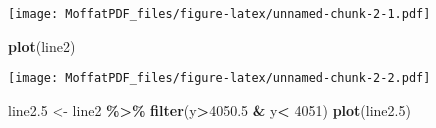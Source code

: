 \documentclass[
]{article}
\newenvironment{Shaded}{\begin{snugshade}}{\end{snugshade}}
\newcommand{\CommentTok}[1]{\textcolor[rgb]{0.56,0.35,0.01}{\textit{#1}}}
\newcommand{\DecValTok}[1]{\textcolor[rgb]{0.00,0.00,0.81}{#1}}
\newcommand{\FloatTok}[1]{\textcolor[rgb]{0.00,0.00,0.81}{#1}}
\newcommand{\FunctionTok}[1]{\textcolor[rgb]{0.13,0.29,0.53}{\textbf{#1}}}
\newcommand{\NormalTok}[1]{#1}
\newcommand{\OtherTok}[1]{\textcolor[rgb]{0.56,0.35,0.01}{#1}}
\newcommand{\SpecialCharTok}[1]{\textcolor[rgb]{0.81,0.36,0.00}{\textbf{#1}}}
\newcommand{\StringTok}[1]{\textcolor[rgb]{0.31,0.60,0.02}{#1}}
\begin{document}
\begin{Shaded}
\end{Shaded}

\texttt{[image: MoffatPDF\_files/figure-latex/unnamed-chunk-2-1.pdf]}

\begin{Shaded}
\begin{Highlighting}[]
\FunctionTok{plot}\NormalTok{(line2)}
\end{Highlighting}
\end{Shaded}

\texttt{[image: MoffatPDF\_files/figure-latex/unnamed-chunk-2-2.pdf]}

\begin{Shaded}
\begin{Highlighting}[]
\NormalTok{line2}\FloatTok{.5} \OtherTok{\textless{}{-}}\NormalTok{ line2 }\SpecialCharTok{\%\textgreater{}\%}
  \FunctionTok{filter}\NormalTok{(y}\SpecialCharTok{\textgreater{}}\FloatTok{4050.5} \SpecialCharTok{\&}\NormalTok{ y}\SpecialCharTok{\textless{}} \DecValTok{4051}\NormalTok{)}
\FunctionTok{plot}\NormalTok{(line2}\FloatTok{.5}\NormalTok{)}
\end{Highlighting}
\end{Shaded}
\end{document}
